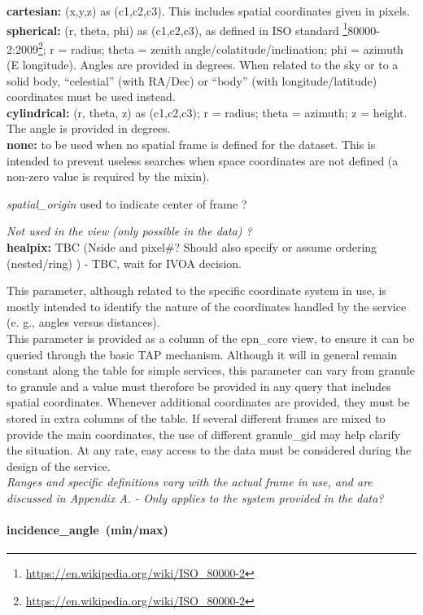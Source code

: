 \documentclass[11pt,a4paper]{ivoa}
\begin{document}
\textbf{cartesian:} (x,y,z) as (c1,c2,c3). This includes spatial coordinates given in pixels.\\ \textbf{spherical:} (r, theta, phi) as (c1,c2,c3), as defined in ISO standard \footnote{\url{https://en.wikipedia.org/wiki/ISO\_80000-2}}80000-2:2009\footnote{\url{https://en.wikipedia.org/wiki/ISO\_80000-2}}; r = radius; theta = zenith angle/colatitude/inclination; phi = azimuth (E longitude). Angles are provided in degrees. When related to the sky or to a solid body, ``celestial'' (with RA/Dec) or ``body'' (with longitude/latitude) coordinates must be used instead. \\\textbf{cylindrical:} (r, theta, z) as (c1,c2,c3); r = radius; theta = azimuth; z = height. The angle is provided in degrees.\\\textbf{none:} to be used when no spatial frame is defined for the dataset. This is intended to prevent useless searches when space coordinates are not defined (a non-zero value is required by the mixin).

\emph{spatial\_origin} used to indicate center of frame ?

\emph{Not used in the view (only possible in the data) ?}\\ \textbf{healpix:} TBC (Nside and pixel\#? Should also specify or assume ordering (nested/ring) ) - TBC, wait for IVOA decision.

This parameter, although related to the specific coordinate system in use, is mostly intended to identify the nature of the coordinates handled by the service (e. g., angles versus distances).\\ This parameter is provided as a column of the epn\_core view, to ensure it can be queried through the basic TAP mechanism. Although it will in general remain constant along the table for simple services, this parameter can vary from granule to granule and a value must therefore be provided in any query that includes spatial coordinates. Whenever additional coordinates are provided, they must be stored in extra columns of the table. If several different frames are mixed to provide the main coordinates, the use of different granule\_gid may help clarify the situation. At any rate, easy access to the data must be considered during the design of the service. \\\emph{ Ranges and specific definitions vary with the actual frame in use, and are discussed in Appendix A. - Only applies to the system provided in the data?} 

\paragraph{incidence\_angle (min/max)}
\end{document}

